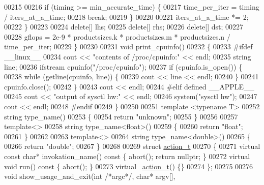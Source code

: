 \begin{DoxyCode}
00215 
00216     \textcolor{keywordflow}{if} (timing >= min\_accurate\_time) \{
00217       time\_per\_iter = timing / iters\_at\_a\_time;
00218       \textcolor{keywordflow}{break};
00219     \}
00220 
00221     iters\_at\_a\_time *= 2;
00222   \}
00223 
00224   \textcolor{keyword}{delete}[] lhs;
00225   \textcolor{keyword}{delete}[] rhs;
00226   \textcolor{keyword}{delete}[] dst;
00227 
00228   gflops = 2e-9 * productsizes.k * productsizes.m * productsizes.n / time\_per\_iter;
00229 \}
00230 
00231 \textcolor{keywordtype}{void} print\_cpuinfo()
00232 \{
00233 \textcolor{preprocessor}{#ifdef \_\_linux\_\_}
00234   cout << \textcolor{stringliteral}{"contents of /proc/cpuinfo:"} << endl;
00235   \textcolor{keywordtype}{string} line;
00236   ifstream cpuinfo(\textcolor{stringliteral}{"/proc/cpuinfo"});
00237   \textcolor{keywordflow}{if} (cpuinfo.is\_open()) \{
00238     \textcolor{keywordflow}{while} (getline(cpuinfo, line)) \{
00239       cout << line << endl;
00240     \}
00241     cpuinfo.close();
00242   \}
00243   cout << endl;
00244 \textcolor{preprocessor}{#elif defined \_\_APPLE\_\_}
00245   cout << \textcolor{stringliteral}{"output of sysctl hw:"} << endl;
00246   system(\textcolor{stringliteral}{"sysctl hw"});
00247   cout << endl;
00248 \textcolor{preprocessor}{#endif}
00249 \}
00250 
00251 \textcolor{keyword}{template} <\textcolor{keyword}{typename} T>
00252 \textcolor{keywordtype}{string} type\_name()
00253 \{
00254   \textcolor{keywordflow}{return} \textcolor{stringliteral}{"unknown"};
00255 \}
00256 
00257 \textcolor{keyword}{template}<>
00258 \textcolor{keywordtype}{string} type\_name<float>()
00259 \{
00260   \textcolor{keywordflow}{return} \textcolor{stringliteral}{"float"};
00261 \}
00262 
00263 \textcolor{keyword}{template}<>
00264 \textcolor{keywordtype}{string} type\_name<double>()
00265 \{
00266   \textcolor{keywordflow}{return} \textcolor{stringliteral}{"double"};
00267 \}
00268 
00269 \textcolor{keyword}{struct }\hyperlink{structaction__t}{action\_t}
00270 \{
00271   \textcolor{keyword}{virtual} \textcolor{keyword}{const} \textcolor{keywordtype}{char}* invokation\_name()\textcolor{keyword}{ const }\{ abort(); \textcolor{keywordflow}{return} \textcolor{keyword}{nullptr}; \}
00272   \textcolor{keyword}{virtual} \textcolor{keywordtype}{void} run()\textcolor{keyword}{ const }\{ abort(); \}
00273   \textcolor{keyword}{virtual} ~\hyperlink{structaction__t}{action\_t}() \{\}
00274 \};
00275 
00276 \textcolor{keywordtype}{void} show\_usage\_and\_exit(\textcolor{keywordtype}{int} \textcolor{comment}{/*argc*/}, \textcolor{keywordtype}{char}* argv[],

\end{DoxyCode}
